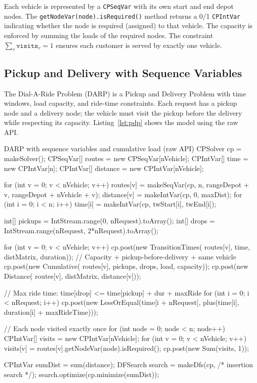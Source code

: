 \documentclass[11pt, a4paper]{scrartcl}
\begin{document}
Each vehicle is represented by a \texttt{CPSeqVar} with its own start and end depot nodes. The \texttt{getNodeVar(node).isRequired()} method returns a 0/1 \texttt{CPIntVar} indicating whether the node is required (assigned) to that vehicle. The capacity is enforced by summing the loads of the required nodes.  The constraint $\sum_v \texttt{visits}_v = 1$ ensures each customer is served by exactly one vehicle.

\subsection{Pickup and Delivery with Sequence Variables}

The Dial-A-Ride Problem (DARP) is a Pickup and Delivery Problem with time windows, load capacity, and ride-time constraints. Each request has a pickup node and a delivery node; the vehicle must visit the pickup before the delivery while respecting its capacity. Listing~\ref{lst:pdp} shows the model using the raw API.

\begin{codebox}[label={lst:pdp}]{DARP with sequence variables and cumulative load (raw API)}
CPSolver cp = makeSolver();
CPSeqVar[] routes = new CPSeqVar[nVehicle];
CPIntVar[] time = new CPIntVar[n];
CPIntVar[] distance = new CPIntVar[nVehicle];

for (int v = 0; v < nVehicle; v++) {
    routes[v] = makeSeqVar(cp, n,
        rangeDepot + v, rangeDepot + nVehicle + v);
    distance[v] = makeIntVar(cp, 0, maxDist);
}
for (int i = 0; i < n; i++)
    time[i] = makeIntVar(cp, twStart[i], twEnd[i]);

int[] pickups = IntStream.range(0, nRequest).toArray();
int[] drops = IntStream.range(nRequest, 2*nRequest).toArray();

for (int v = 0; v < nVehicle; v++) {
    cp.post(new TransitionTimes(
        routes[v], time, distMatrix, duration));
    // Capacity + pickup-before-delivery + same vehicle
    cp.post(new Cumulative(
        routes[v], pickups, drops, load, capacity));
    cp.post(new Distance(
        routes[v], distMatrix, distance[v]));
}

// Max ride time: time[drop] <= time[pickup] + dur + maxRide
for (int i = 0; i < nRequest; i++)
    cp.post(new LessOrEqual(time[i + nRequest],
        plus(time[i], duration[i] + maxRideTime)));

// Each node visited exactly once
for (int node = 0; node < n; node++) {
    CPIntVar[] visits = new CPIntVar[nVehicle];
    for (int v = 0; v < nVehicle; v++)
        visits[v] = routes[v].getNodeVar(node).isRequired();
    cp.post(new Sum(visits, 1));
}

CPIntVar sumDist = sum(distance);
DFSearch search = makeDfs(cp, /* insertion search */);
search.optimize(cp.minimize(sumDist));
\end{codebox}
\end{document}
